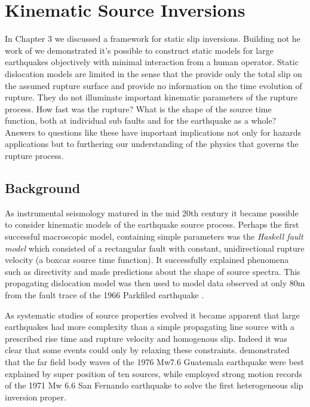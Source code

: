 
\chapter{Kinematic Source Inversions}

In Chapter 3 we discussed a framework for static slip inversions. Building not he work of \citet{Crowell2012} we demonstrated it's possible to construct static models for large earthquakes objectively with minimal interaction from a human operator. Static dislocation models are limited in the sense that the provide only the total slip on the assumed rupture surface and provide no information on the time evolution of rupture. They do not illuminate important kinematic parameters of the rupture process. How fast was the rupture? What is the shape of the source time function, both at individual sub faults and for the earthquake as a whole? Answers to questions like these have important implications not only for hazards applications but to furthering our understanding of the physics that governs the rupture process.

\section{Background}

As instrumental seismology matured in the mid 20th century it became possible to consider kinematic models of the earthquake source process. Perhaps the first successful macroscopic model, containing simple parameters was the \textit{Haskell fault model} \citep{haskell1964,haskell1969} which consisted of a rectangular fault with constant, unidirectional rupture velocity (a boxcar source time function). It successfully explained phenomena such as directivity and made predictions about the shape of source spectra. This propagating dislocation model was then used to model data observed at only 80m from the fault trace of the 1966 Parkfiled earthquake \citep{aki1968}.

As systematic studies of source properties evolved it became apparent that large earthquakes had more complexity than a simple propagating line source with a prescribed rise time and rupture velocity and homogenous slip. Indeed it was clear that some events could only by relaxing these constraints. \citet{kanamori1978} demonstrated that the far field body waves of the 1976 Mw7.6 Guatemala earthquake were best explained by super position of ten sources, while \citet{trifunac1974} employed strong motion records of the 1971 Mw 6.6 San Fernando earthquake to solve the first heterogeneous slip inversion proper.

